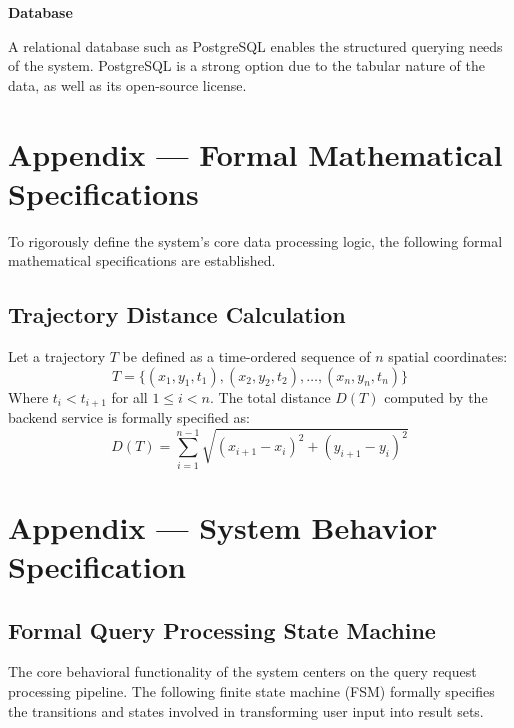 \documentclass[12pt]{article}
\begin{document}
\vspace{\baselineskip}

\textbf{Database}

\par{A relational database such as PostgreSQL enables the structured querying needs of the system. PostgreSQL is a strong option due to the tabular nature of the data, as well as its open-source license.   }

\newpage{}
\section*{Appendix --- Formal Mathematical Specifications}

To rigorously define the system's core data processing logic, the following formal mathematical specifications are established.

\subsection*{Trajectory Distance Calculation}
Let a trajectory $T$ be defined as a time-ordered sequence of $n$ spatial coordinates:
\begin{equation}
T = \{(x_1, y_1, t_1), (x_2, y_2, t_2), \dots, (x_n, y_n, t_n)\}
\end{equation}
Where $t_i < t_{i+1}$ for all $1 \leq i < n$. The total distance $D(T)$ computed by the backend service is formally specified as:
\begin{equation}
D(T) = \sum_{i=1}^{n-1} \sqrt{(x_{i+1} - x_i)^2 + (y_{i+1} - y_i)^2}
\end{equation}


\newpage{}
\section*{Appendix --- System Behavior Specification}
\label{sec:system-behavior-spec}

\subsection*{Formal Query Processing State Machine}

The core behavioral functionality of the system centers on the query request processing pipeline. The following finite state machine (FSM) formally specifies the transitions and states involved in transforming user input into result sets.
\end{document}

